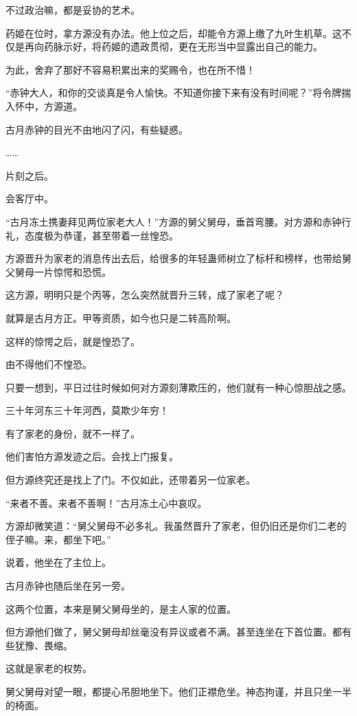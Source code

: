 \begin{this_body}
不过政治嘛，都是妥协的艺术。

药姬在位时，拿方源没有办法。他上位之后，却能令方源上缴了九叶生机草。这不仅是再向药脉示好，将药姬的遗政贯彻，更在无形当中显露出自己的能力。

为此，舍弃了那好不容易积累出来的奖赐令，也在所不惜！

“赤钟大人，和你的交谈真是令人愉快。不知道你接下来有没有时间呢？”将令牌揣入怀中，方源道。

古月赤钟的目光不由地闪了闪，有些疑惑。

……

片刻之后。

会客厅中。

“古月冻土携妻拜见两位家老大人！”方源的舅父舅母，垂首弯腰。对方源和赤钟行礼，态度极为恭谨，甚至带着一丝惶恐。

方源晋升为家老的消息传出去后，给很多的年轻蛊师树立了标杆和榜样，也带给舅父舅母一片惊愕和恐慌。

这方源，明明只是个丙等，怎么突然就晋升三转，成了家老了呢？

就算是古月方正。甲等资质，如今也只是二转高阶啊。

这样的惊愕之后，就是惶恐了。

由不得他们不惶恐。

只要一想到，平日过往时候如何对方源刻薄欺压的，他们就有一种心惊胆战之感。

三十年河东三十年河西，莫欺少年穷！

有了家老的身份，就不一样了。

他们害怕方源发迹之后。会找上门报复。

但方源终究还是找上了门。不仅如此，还带着另一位家老。

“来者不善。来者不善啊！”古月冻土心中哀叹。

方源却微笑道：“舅父舅母不必多礼。我虽然晋升了家老，但仍旧还是你们二老的侄子嘛。来，都坐下吧。”

说着，他坐在了主位上。

古月赤钟也随后坐在另一旁。

这两个位置，本来是舅父舅母坐的，是主人家的位置。

但方源他们做了，舅父舅母却丝毫没有异议或者不满。甚至连坐在下首位置。都有些犹豫、畏缩。

这就是家老的权势。

舅父舅母对望一眼，都提心吊胆地坐下。他们正襟危坐。神态拘谨，并且只坐一半的椅面。


\end{this_body}
